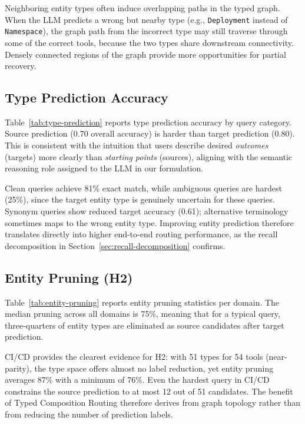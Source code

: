 Neighboring entity types often induce overlapping paths in the typed graph.
When the LLM predicts a wrong but nearby type (e.g., \texttt{Deployment} instead of \texttt{Namespace}), the graph path from the incorrect type may still traverse through some of the correct tools, because the two types share downstream connectivity.
Densely connected regions of the graph provide more opportunities for partial recovery.


\subsection{Type Prediction Accuracy}
\label{sec:type-prediction}



Table~\ref{tab:type-prediction} reports type prediction accuracy by query category.
Source prediction (0.70 overall accuracy) is harder than target prediction (0.80).
This is consistent with the intuition that users describe desired \emph{outcomes} (targets) more clearly than \emph{starting points} (sources), aligning with the semantic reasoning role assigned to the LLM in our formulation.

Clean queries achieve 81\% exact match, while ambiguous queries are hardest (25\%), since the target entity type is genuinely uncertain for these queries.
Synonym queries show reduced target accuracy (0.61); alternative terminology sometimes maps to the wrong entity type.
Improving entity prediction therefore translates directly into higher end-to-end routing performance, as the recall decomposition in Section~\ref{sec:recall-decomposition} confirms.


\subsection{Entity Pruning (H2)}
\label{sec:entity-pruning}



Table~\ref{tab:entity-pruning} reports entity pruning statistics per domain.
The median pruning across all domains is 75\%, meaning that for a typical query, three-quarters of entity types are eliminated as source candidates after target prediction.

CI/CD provides the clearest evidence for H2: with 51 types for 54 tools (near-parity), the type space offers almost no label reduction, yet entity pruning averages 87\% with a minimum of 76\%.
Even the hardest query in CI/CD constrains the source prediction to at most 12 out of 51 candidates.
The benefit of Typed Composition Routing therefore derives from graph topology rather than from reducing the number of prediction labels.

